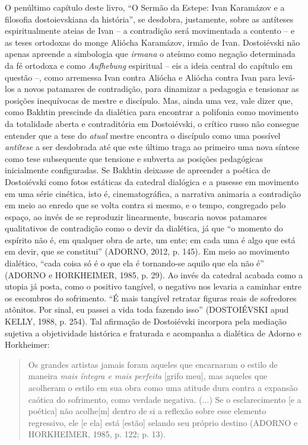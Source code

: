 O penúltimo capítulo deste livro, ``O Sermão da Estepe: Ivan Karamázov e
a filosofia dostoievskiana da história'', se desdobra, justamente, sobre
as antíteses espiritualmente ateias de Ivan -- a contradição será
movimentada a contento -- e as teses ortodoxas do monge Aliócha
Karamázov, irmão de Ivan. Dostoiévski não apenas apreende a simbologia
que \emph{irmana} o ateísmo como negação determinada da fé ortodoxa e
como \emph{Aufhebung} espiritual -- eis a ideia central do capítulo em
questão --, como arremessa Ivan contra Aliócha e Aliócha contra Ivan
para levá-los a novos patamares de contradição, para dinamizar a
pedagogia e tensionar as posições inequívocas de mestre e discípulo.
Mas, ainda uma vez, vale dizer que, como Bakhtin prescinde da dialética
para encontrar a polifonia como movimento da totalidade aberta e
contraditória em Dostoiévski, o crítico russo não consegue entender que
a tese do \emph{atual} mestre encontra o discípulo como uma possível
\emph{antítese} a ser desdobrada até que este último traga ao primeiro
uma nova síntese como tese subsequente que tensione e subverta as
posições pedagógicas inicialmente configuradas. Se Bakhtin deixasse de
apreender a poética de Dostoiévski como fotos estáticas da catedral
dialógica e a pusesse em movimento em uma série cinética, isto é,
cinematográfica, a narrativa animaria a contradição em meio ao enredo
que se volta contra si mesmo, e o tempo, congregado pelo espaço, ao
invés de se reproduzir linearmente, buscaria novos patamares
qualitativos de contradição como o devir da dialética, já que ``o
momento do espírito não é, em qualquer obra de arte, um ente; em cada
uma é algo que está em devir, que se constitui'' (ADORNO, 2012, p. 145).
Em meio ao movimento dialético, ``cada coisa só é o que ela é
tornando-se aquilo que ela não é'' (ADORNO e HORKHEIMER, 1985, p. 29).
Ao invés da catedral acabada como a utopia já posta, como o positivo
tangível, o negativo nos levaria a caminhar entre os escombros do
sofrimento. ``É mais tangível retratar figuras reais de sofredores
atônitos. Por sinal, eu passei a vida toda fazendo isso'' (DOSTOIÉVSKI
apud KELLY, 1988, p. 254). Tal afirmação de Dostoiévski incorpora pela
mediação sujetiva a objetividade histórica e fraturada e acompanha a
dialética de Adorno e Horkheimer:

\begin{quote}
Os grandes artistas jamais foram aqueles que encarnaram o estilo de
maneira \emph{mais íntegra e mais perfeita} {[}grifo meu{]}, mas aqueles
que acolheram o estilo em sua obra como uma atitude dura contra a
expansão caótica do sofrimento, como verdade negativa. (...) Se o
esclarecimento {[}e a poética{]} não acolhe{[}m{]} dentro de si a
reflexão sobre esse elemento regressivo, ele {[}e ela{]} está
{[}estão{]} selando seu próprio destino (ADORNO e HORKHEIMER, 1985, p.
122; p. 13).
\end{quote}


